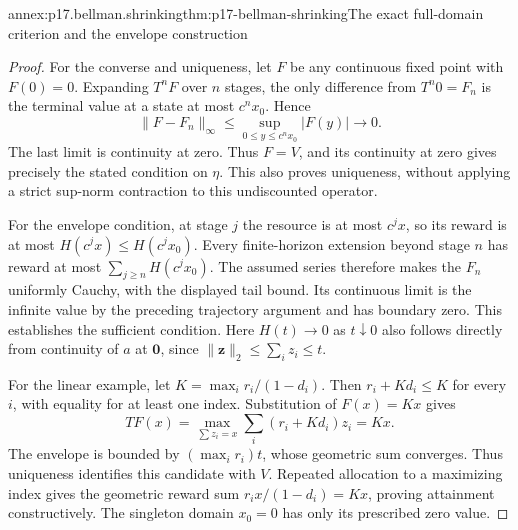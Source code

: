 \begin{annexitem}{annex:p17.bellman.shrinking}{thm:p17-bellman-shrinking}{The exact full-domain criterion and the envelope construction}
\begin{proof}
For the converse and uniqueness, let \(F\)
be any continuous fixed point with \(F(0)=0\).
Expanding \(T^nF\) over \(n\) stages, the
only difference from \(T^n0=F_n\) is the
terminal value at a state at most \(c^n x_0\).
Hence
\[
        \|F-F_n\|_\infty
                  \leq\sup_{0\leq y\leq c^n x_0}|F(y)|
                                \longrightarrow0.
\]
The last limit is continuity at zero.
Thus \(F=V\), and its continuity at zero
gives precisely the stated condition on
\(\eta\). This also proves uniqueness,
without applying a strict sup-norm
contraction to this undiscounted operator.

For the envelope condition, at stage \(j\)
the resource is at most \(c^j x\), so its
reward is at most \(H(c^j x)\leq H(c^j x_0)\).
Every finite-horizon extension beyond stage
\(n\) has reward at most
\(\sum_{j\geq n}H(c^j x_0)\).
The assumed series therefore makes the
\(F_n\) uniformly Cauchy, with the displayed
tail bound. Its continuous limit is the
infinite value by the preceding trajectory
argument and has boundary zero.
This establishes the sufficient condition.
Here \(H(t)\to0\) as \(t\downarrow0\)
also follows directly from continuity of
\(a\) at \(\mathbf0\), since
\(\|\mathbf z\|_2\leq\sum_i z_i\leq t\).

For the linear example, let
\(K=\max_i r_i/(1-d_i)\).
Then \(r_i+Kd_i\leq K\) for every \(i\),
with equality for at least one index.
Substitution of \(F(x)=Kx\) gives
\[
 TF(x)=\max_{\sum z_i=x}\sum_i(r_i+Kd_i)z_i=Kx.
\]
The envelope is bounded by
\((\max_i r_i)t\), whose geometric sum
converges. Thus uniqueness identifies this
candidate with \(V\). Repeated allocation
to a maximizing index gives the geometric
reward sum \(r_ix/(1-d_i)=Kx\), proving
attainment constructively.
The singleton domain \(x_0=0\) has only
its prescribed zero value.
\end{proof}
\end{annexitem}

